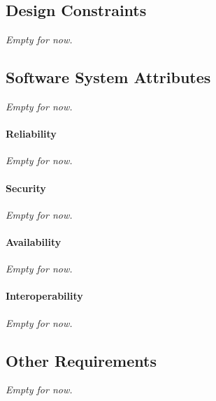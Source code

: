 	\subsection{Design Constraints}
	\textit{Empty for now.}
	
	\subsection{Software System Attributes}
	\textit{Empty for now.}
	\paragraph{Reliability}
	\textit{Empty for now.}
	\paragraph{Security}
	\textit{Empty for now.}
	\paragraph{Availability}
	\textit{Empty for now.}
	\paragraph{Interoperability}
	\textit{Empty for now.}
	
	\subsection{Other Requirements}
	\textit{Empty for now.}
	

